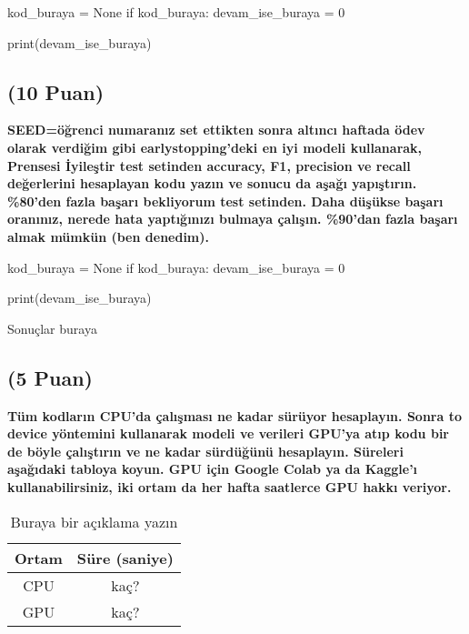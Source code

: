 \documentclass[11pt]{article}
\begin{document}
\begin{python}
kod_buraya = None
if kod_buraya:
    devam_ise_buraya = 0

print(devam_ise_buraya)
\end{python}

\begin{comment}
\begin{figure}[ht!]
    \centering
    \texttt{[image: mypicturehere.png]}
    \caption{Buraya açıklama yazın}
    \label{fig:my_pic}
\end{figure}
\end{comment}

\subsection{(10 Puan)} \textbf{SEED=öğrenci numaranız set ettikten sonra altıncı haftada ödev olarak verdiğim gibi earlystopping'deki en iyi modeli kullanarak, Prensesi İyileştir test setinden accuracy, F1, precision ve recall değerlerini hesaplayan kodu yazın ve sonucu da aşağı yapıştırın. \%80'den fazla başarı bekliyorum test setinden. Daha düşükse başarı oranınız, nerede hata yaptığınızı bulmaya çalışın. \%90'dan fazla başarı almak mümkün (ben denedim).}

\begin{python}
kod_buraya = None
if kod_buraya:
    devam_ise_buraya = 0

print(devam_ise_buraya)
\end{python}

Sonuçlar buraya

\subsection{(5 Puan)} \textbf{Tüm kodların CPU'da çalışması ne kadar sürüyor hesaplayın. Sonra to device yöntemini kullanarak modeli ve verileri GPU'ya atıp kodu bir de böyle çalıştırın ve ne kadar sürdüğünü hesaplayın. Süreleri aşağıdaki tabloya koyun. GPU için Google Colab ya da Kaggle'ı kullanabilirsiniz, iki ortam da her hafta saatlerce GPU hakkı veriyor.}

\begin{table}[ht!]
    \centering
    \caption{Buraya bir açıklama yazın}
    \begin{tabular}{c|c}
        Ortam & Süre (saniye) \\\hline
        CPU & kaç? \\
        GPU & kaç?\\
    \end{tabular}
    \label{tab:my_table}
\end{table}
\end{document}
